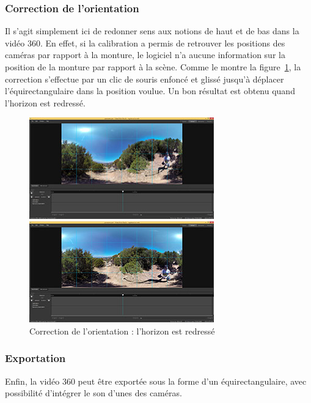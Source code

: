 \subsubsection{Correction de l'orientation}
Il s'agit simplement ici de redonner sens aux notions de haut et de bas dans la 
vidéo 360. En effet, si la calibration a permis de retrouver les positions des 
caméras par rapport à la monture, le logiciel n'a aucune information sur la position
de la monture par rapport à la scène. Comme le montre la figure~\ref{orientation},
la correction s'effectue par un clic de souris enfoncé
et glissé jusqu'à déplacer l'équirectangulaire dans la position voulue. Un bon résultat
est obtenu quand l'horizon est redressé.
\begin{figure}
  \centering
  \begin{minipage}{0.45\textwidth}
    \centering
    \includegraphics[width=8.0cm]{images/studio-output-exposure-grid.jpg}
  \end{minipage}%
  \hspace{0.08\textwidth}
  \begin{minipage}{0.45\textwidth}
    \centering
    \includegraphics[width=8.0cm]{images/studio-output-exposure-grid-oriented.jpg}
  \end{minipage}
  \caption{Correction de l'orientation : l'horizon est redressé}
  \label{orientation}
\end{figure}

\subsubsection{Exportation}
\label{exportation}
Enfin, la vidéo 360 peut être exportée sous la forme d'un équirectangulaire, avec
possibilité d'intégrer le son d'unes des caméras.

